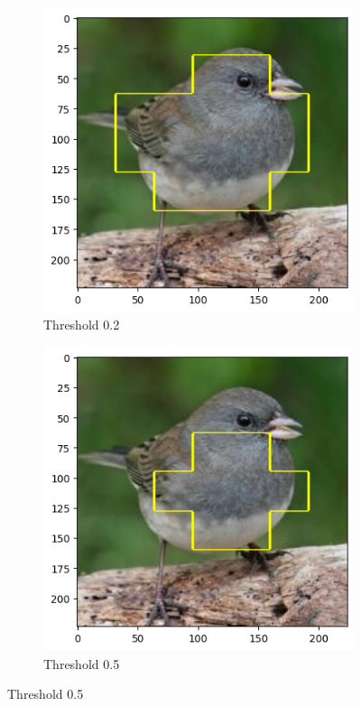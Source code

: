 \begin{figure}[!h]
\begin{subfigure}[b]{0.45\textwidth}
		\centering\includegraphics[width=.9\textwidth]{img/parameters/gradcam/threshold_02}
		\caption{Threshold 0.2}  \label{rys:parameters_lime_numsamples_1000}
	\end{subfigure}
	\begin{subfigure}[b]{0.45\textwidth}
		\centering\includegraphics[width=.9\textwidth]{img/parameters/gradcam/threshold_05}
		\caption{Threshold 0.5}  \label{rys:parameters_lime_numsamples_1000}

\end{subfigure}
\end{figure}
